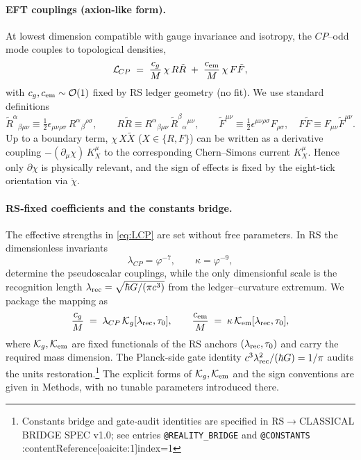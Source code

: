 \documentclass[11pt]{article}
\begin{document}
\paragraph{EFT couplings (axion‑like form).}
At lowest dimension compatible with gauge invariance and isotropy, the \(CP\)–odd mode couples to topological densities,
\begin{equation}
  \mathcal{L}_{\!CP}
  \;=\;
  \frac{c_g}{M}\,\chi\, R\tilde R \;+\; \frac{c_{\rm em}}{M}\,\chi\, F\tilde F,
  \label{eq:LCP}
\end{equation}
with \(c_g,c_{\rm em}\sim\mathcal{O}(1)\) fixed by RS ledger geometry (no fit). We use standard definitions
\begin{equation}
  \tilde{R}^{\alpha}{}_{\beta\mu\nu}\equiv \tfrac12 \epsilon_{\mu\nu\rho\sigma}\,R^{\alpha}{}_{\beta}{}^{\rho\sigma},
  \qquad
  R\tilde R \equiv R^{\alpha}{}_{\beta\mu\nu}\,\tilde{R}^{\beta}{}_{\alpha}{}^{\mu\nu},
  \qquad
  \tilde F^{\mu\nu}\equiv \tfrac12 \epsilon^{\mu\nu\rho\sigma}F_{\rho\sigma},
  \quad
  F\tilde F\equiv F_{\mu\nu}\tilde F^{\mu\nu}.
\end{equation}
Up to a boundary term, \(\chi\,X\tilde X\) (\(X\in\{R,F\}\)) can be written as a derivative coupling \(-(\partial_\mu\chi)\,K^\mu_X\) to the corresponding Chern–Simons current \(K^\mu_X\). Hence only \(\partial\chi\) is physically relevant, and the sign of effects is fixed by the eight‑tick orientation via \(\dot\chi\).

\paragraph{RS‑fixed coefficients and the constants bridge.}
The effective strengths in \eqref{eq:LCP} are set without free parameters. In RS the dimensionless invariants
\begin{equation}
  \lambda_{CP}=\varphi^{-7},
  \qquad
  \kappa=\varphi^{-9},
\end{equation}
determine the pseudoscalar couplings, while the only dimensionful scale is the recognition length
\(
  \lambda_{\rm rec}=\sqrt{\hbar G/(\pi c^3)}
\)
from the ledger–curvature extremum. We package the mapping as
\begin{equation}
  \frac{c_g}{M} \;=\; \lambda_{CP}\,\mathcal{K}_g[\lambda_{\rm rec},\tau_0],
  \qquad
  \frac{c_{\rm em}}{M} \;=\; \kappa\,\mathcal{K}_{\rm em}[\lambda_{\rm rec},\tau_0],
  \label{eq:RSmap}
\end{equation}
where \(\mathcal{K}_g,\mathcal{K}_{\rm em}\) are fixed functionals of the RS anchors \((\lambda_{\rm rec},\tau_0)\) and carry the required mass dimension. The Planck‑side gate identity
\(
  c^3\lambda_{\rm rec}^2/(\hbar G)=1/\pi
\)
audits the units restoration.\footnote{Constants bridge and gate‑audit identities are specified in RS\(\to\)CLASSICAL BRIDGE SPEC v1.0; see entries \texttt{@REALITY\_BRIDGE} and \texttt{@CONSTANTS} :contentReference[oaicite:1]{index=1}}
The explicit forms of \(\mathcal{K}_g,\mathcal{K}_{\rm em}\) and the sign conventions are given in Methods, with no tunable parameters introduced there.
\end{document}
